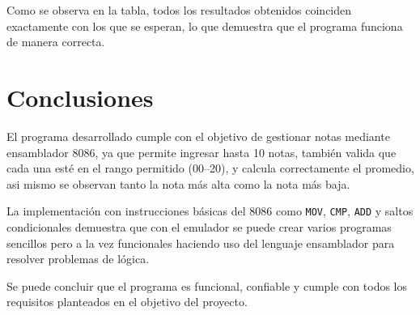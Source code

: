 \documentclass[12pt,a4paper]{article}
\begin{document}
Como se observa en la tabla, todos los resultados obtenidos coinciden exactamente con los que se esperan, lo que demuestra que el programa funciona de manera correcta.

\section*{Conclusiones}

El programa desarrollado cumple con el objetivo de gestionar notas mediante ensamblador 8086, ya que permite ingresar hasta 10 notas, tambi\'en valida que cada una est\'e en el rango permitido (00--20), y calcula correctamente el promedio, asi mismo se observan tanto la nota m\'as alta como la nota m\'as baja.

La implementaci\'on con instrucciones b\'asicas del 8086 como \texttt{MOV}, \texttt{CMP}, \texttt{ADD} y saltos condicionales demuestra que con el emulador se puede crear varios programas sencillos pero a la vez funcionales haciendo uso del lenguaje ensamblador para resolver problemas de l\'ogica.

Se puede concluir que el programa es funcional, confiable y cumple con todos los requisitos planteados en el objetivo del proyecto.
\end{document}

